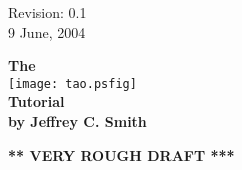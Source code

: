 \documentclass{book}
\begin{document}

\thispagestyle{empty}

\begin{flushright}
\large
  Revision: 0.1 \\
  9 June, 2004 \\
\end{flushright}

\vfill

{
\begin{center}
{\Huge \sf\bf The} \\
\vskip 0.1in
\texttt{[image: tao.psfig]} \\
\vskip 0.1in
{\Huge \sf\bf Tutorial} \\
\vskip 0.1in
{\normalsize \sf\bf by Jeffrey C. Smith} \\
\end{center}
}

\vskip 1in
\begin{center}
{\Huge \bf *** VERY ROUGH DRAFT ***}
\end{center}
\vfill
\break
\end{document}
